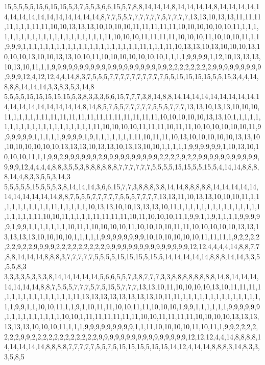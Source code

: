 15,5,5,5,5,15,6,15,15,5,3,7,5,5,3,6,6,15,5,7,8,8,14,14,14,8,14,14,14,14,8,14,14,14,14,14,14,14,14,14,14,14,14,14,14,14,8,7,7,5,5,7,7,7,7,7,7,5,7,7,7,7,13,13,10,13,13,11,11,11,11,1,1,1,11,11,10,10,13,13,13,10,10,10,10,11,11,11,11,11,10,10,10,10,10,10,11,1,1,1,1,1,1,1,1,1,1,1,1,1,1,1,1,1,1,1,1,1,11,10,10,10,11,11,11,11,10,10,10,11,10,10,10,11,1,1,9,9,9,1,1,1,1,1,1,1,1,1,1,1,1,1,1,1,1,1,1,1,1,1,11,1,1,1,11,10,13,13,10,13,10,10,10,13,10,10,10,13,10,10,13,13,10,10,11,10,10,10,10,10,10,10,1,1,1,1,9,9,9,9,1,12,10,13,13,13,10,13,10,11,1,1,9,9,9,9,9,9,9,9,9,9,9,9,9,9,9,9,9,9,9,9,9,2,2,2,2,2,2,2,2,9,9,9,9,9,9,9,9,9,9,9,9,12,4,12,12,4,4,14,8,3,7,5,5,5,7,7,7,7,7,7,7,7,7,7,5,5,15,15,15,15,5,5,15,3,4,4,14,8,8,8,14,14,14,3,3,8,3,5,3,14,8
5,5,5,5,15,15,15,15,15,5,3,8,3,3,3,6,6,15,7,7,7,3,8,14,8,8,14,14,14,14,14,14,14,14,14,14,14,14,14,14,14,14,14,14,8,14,8,5,7,5,5,7,7,7,7,7,5,5,5,7,7,7,13,13,10,13,13,10,10,10,11,1,1,1,1,1,11,11,11,11,11,11,11,11,11,11,11,11,11,10,10,10,10,10,13,13,10,1,1,1,1,1,1,1,1,1,1,1,1,1,1,1,1,1,1,1,1,1,11,10,10,10,10,11,11,11,10,11,11,10,10,10,10,10,10,11,9,9,9,9,9,9,1,1,1,1,1,9,9,9,9,1,9,1,1,1,1,1,1,1,11,10,11,11,10,13,10,10,10,10,10,13,13,10,10,10,10,10,10,10,13,13,13,10,13,13,10,13,13,10,10,1,1,1,1,1,9,9,9,9,9,9,1,10,13,10,10,10,10,11,1,1,9,9,2,9,9,9,9,9,9,2,9,9,9,9,9,9,9,9,9,9,2,2,2,2,9,2,2,9,9,9,9,9,9,9,9,9,9,9,9,9,9,12,4,4,4,4,8,8,3,5,5,3,8,8,8,8,8,8,7,7,7,7,7,7,5,5,5,5,15,15,5,5,15,5,4,14,14,8,8,8,8,14,4,8,3,3,5,5,3,14,3
5,5,5,5,5,15,5,5,5,3,8,14,14,14,3,6,6,15,7,7,3,8,8,8,3,8,14,14,8,8,8,8,8,14,14,14,14,14,14,14,14,14,14,14,8,8,7,5,5,5,7,7,7,7,7,5,5,5,7,7,7,7,13,13,11,10,13,13,10,10,10,11,1,1,1,1,1,1,1,1,1,1,11,1,1,1,1,1,10,13,13,10,10,13,13,13,10,11,1,1,1,1,1,1,1,1,1,1,1,1,1,1,1,1,1,1,1,1,11,10,10,11,1,1,1,1,11,11,11,11,10,11,10,10,10,11,1,9,9,1,1,9,1,1,1,1,9,9,9,9,9,1,9,9,1,1,1,1,1,1,1,10,11,1,10,10,10,10,11,10,10,10,10,11,11,10,10,10,10,10,13,13,13,13,13,13,10,10,10,10,1,1,1,1,1,9,9,9,9,9,9,9,9,10,10,10,10,10,10,11,11,11,1,9,2,2,2,2,2,2,9,2,2,9,9,9,9,2,2,2,2,2,2,2,2,2,9,9,9,9,9,9,9,9,9,9,9,9,9,9,9,12,12,4,4,4,4,14,8,8,7,7,8,8,14,14,14,8,8,8,3,7,7,7,7,7,5,5,5,5,15,15,15,5,15,5,14,14,14,14,14,8,8,8,14,14,3,3,5,5,5,8,3
3,3,3,3,5,3,3,3,8,14,14,14,14,14,5,6,6,5,5,7,3,8,7,7,7,3,3,8,8,8,8,8,8,8,8,14,8,14,14,14,14,14,14,14,8,8,7,5,5,5,7,7,7,5,7,5,15,5,7,7,7,13,13,10,11,10,10,10,10,13,10,11,11,11,1,1,1,1,1,1,1,1,1,1,1,1,1,11,13,13,13,13,13,13,13,13,10,11,11,1,1,1,1,1,1,1,1,1,1,1,1,1,1,1,1,9,9,1,1,10,10,11,1,1,9,1,10,11,11,10,10,11,11,10,10,10,1,9,9,1,1,1,1,1,1,9,9,9,9,9,9,1,1,1,1,1,1,1,1,1,1,10,10,1,11,11,11,11,11,11,10,10,11,11,11,11,10,10,10,10,13,13,13,13,13,13,10,10,10,11,1,1,1,9,9,9,9,9,9,9,9,9,1,1,11,10,10,10,10,11,10,11,1,9,9,2,2,2,2,2,2,2,9,9,2,2,2,2,2,2,2,2,2,2,2,2,9,9,9,9,9,9,9,9,9,9,9,9,9,9,9,9,12,12,12,4,4,14,8,8,8,8,14,14,14,14,14,8,8,8,8,7,7,7,7,7,5,5,7,5,15,15,15,5,15,15,14,12,4,14,14,8,8,8,3,14,8,3,3,3,5,8,5
